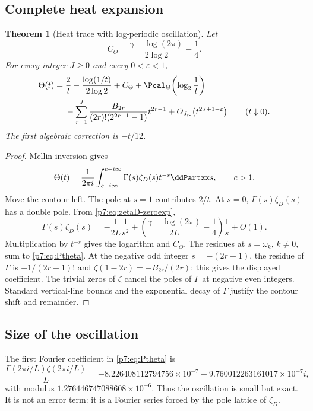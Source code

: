 \documentclass[11pt]{article}
\numberwithin{equation}{section}
\newtheorem{theorem}{Theorem}[section]
\theoremstyle{definition}
\theoremstyle{remark}
\begin{document}
\subsection{Complete heat expansion}

\begin{theorem}[Heat trace with log-periodic oscillation]\label{p7:thm:heat}
Let
\begin{equation}\label{p7:eq:Ctheta}
 C_\Theta=\frac{\gamma-\log(2\pi)}{2\log2}-\frac14.
\end{equation}
For every integer $J\ge0$ and every $0<\varepsilon<1$,
\begin{align}\label{p7:eq:heat-asymp}
 \Theta(t)
 ={}&\frac2t-\frac{\log(1/t)}{2\log2}+C_\Theta
 +\Pcal_\Theta\!\left(\log_2\frac1t\right)\\
 &-\sum_{r=1}^{J}
 \frac{B_{2r}}{(2r)!(2^{2r-1}-1)}t^{2r-1}
 +O_{J,\varepsilon}\!\left(t^{2J+1-\varepsilon}\right)
 \qquad(t\downarrow0).\notag
\end{align}
The first algebraic correction is $-t/12$.
\end{theorem}

\begin{proof}
Mellin inversion gives
\[
 \Theta(t)=\frac1{2\pi i}\int_{c-i\infty}^{c+i\infty}
 \Gamma(s)\zeta_D(s)t^{-s}\ddPartxx s,
 \qquad c>1.
\]
Move the contour left.  The pole at $s=1$ contributes $2/t$.  At $s=0$, $\Gamma(s)\zeta_D(s)$ has a double pole.  From \cref{p7:eq:zetaD-zeroexp},
\[
 \Gamma(s)\zeta_D(s)
 =-\frac1{2L}\frac1{s^2}
 +\left(\frac{\gamma-\log(2\pi)}{2L}-\frac14\right)\frac1s+O(1).
\]
Multiplication by $t^{-s}$ gives the logarithm and $C_\Theta$.  The residues at $s=\omega_k$, $k\ne0$, sum to \cref{p7:eq:Ptheta}.  At the negative odd integer $s=-(2r-1)$, the residue of $\Gamma$ is $-1/(2r-1)!$ and $\zeta(1-2r)=-B_{2r}/(2r)$; this gives the displayed coefficient.  The trivial zeros of $\zeta$ cancel the poles of $\Gamma$ at negative even integers.  Standard vertical-line bounds and the exponential decay of $\Gamma$ justify the contour shift and remainder.
\end{proof}

\subsection{Size of the oscillation}

The first Fourier coefficient in \cref{p7:eq:Ptheta} is
\begin{equation}\label{p7:eq:Pfirst}
 \frac{\Gamma(2\pi i/L)\zeta(2\pi i/L)}L
 =-8.226408112794756\times10^{-7}
  -9.760012263161017\times10^{-7}i,
\end{equation}
with modulus $1.276446747088608\times10^{-6}$.  Thus the oscillation is small but exact.  It is not an error term: it is a Fourier series forced by the pole lattice of $\zeta_D$.
\end{document}
